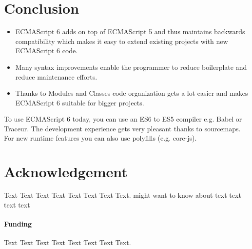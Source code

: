 \documentclass{bioinfo}
\begin{document}
\section{Conclusion}
\begin{itemize}
        \item ECMAScript 6 adds on top of ECMAScript 5 and thus maintains backwards compatibility which makes it easy to extend existing projects with new ECMAScript 6 code. 
        \item Many syntax improvements enable the programmer to reduce boilerplate and reduce maintenance efforts. 
        \item Thanks to Modules and Classes code organization gets a lot easier and makes ECMAScript 6 suitable for bigger projects.
\end{itemize}
To use ECMAScript 6 today, you can use an ES6 to ES5 compiler e.g. Babel or Traceur. The development experience gets
very pleasant thanks to sourcemaps. For new runtime features you can also use polyfills (e.g. core-js).

\section*{Acknowledgement}
Text Text Text Text Text Text  Text Text.  \citealp{Boffelli03} might want to know about  text text text text

\paragraph{Funding\textcolon} Text Text Text Text Text Text  Text Text.

%
%
%
%
%
%
%
%
%
\end{document}
